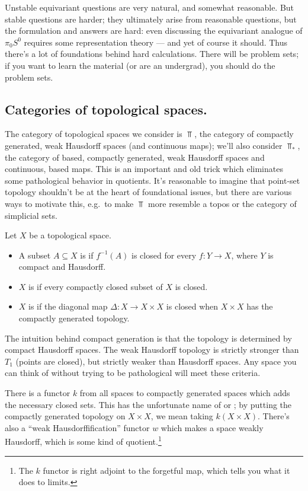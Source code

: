Unstable equivariant questions are very natural, and somewhat reasonable. But stable questions are harder; they
ultimately arise from reasonable questions, but the formulation and answers are hard: even discussing the
equivariant analogue of $\pi_0S^0$ requires some representation theory --- and yet of course it should. Thus
there's a lot of foundations behind hard calculations. There will be problem sets; if you want to learn the
material (or are an undergrad), you should do the problem sets.
\subsection*{Categories of topological spaces.}
The category of topological spaces we consider is $\Top$, the category of compactly generated, weak Hausdorff
spaces (and continuous maps); we'll also consider $\Top_*$, the category of based, compactly generated, weak
Hausdorff spaces and continuous, based maps. This is an important and old trick which eliminates some pathological
behavior in quotients. It's reasonable to imagine that point-set topology shouldn't be at the heart of foundational
issues, but there are various ways to motivate this, e.g.\ to make $\Top$ more resemble a topos or the category of
simplicial sets.
\begin{defn}
Let $X$ be a topological space.
\begin{itemize}
	\item A subset $A\subseteq X$ is  if $f^{-1}(A)$ is closed for every $f\colon Y\to X$,
	where $Y$ is compact and Hausdorff.
	\item $X$ is  if every compactly closed subset of $X$ is closed.
	\item $X$ is  if the diagonal map $\Delta\colon X\to X\times X$ is closed when $X\times X$
	has the compactly generated topology.
\end{itemize}
\end{defn}
The intuition behind compact generation is that the topology is determined by compact Hausdorff spaces. The weak
Hausdorff topology is strictly stronger than $T_1$ (points are closed), but strictly weaker than Hausdorff spaces.
Any space you can think of without trying to be pathological will meet these criteria.

There is a functor $k$ from all spaces to compactly generated spaces which adds the necessary closed sets. This has
the unfortunate name of  or ; by putting the compactly generated topology
on $X\times X$, we mean taking $k(X\times X)$. There's also a ``weak Hausdorffification'' functor $w$ which makes a
space weakly Hausdorff, which is some kind of quotient.\footnote{The $k$ functor is right adjoint to the forgetful
map, which tells you what it does to limits.}

